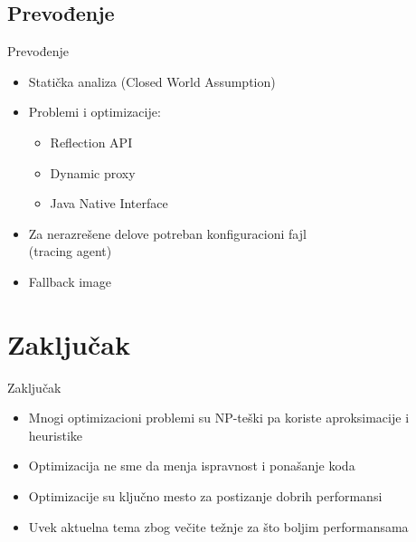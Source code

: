 \documentclass[compress, containsverbatim,mathserif, xcolor=dvipsnames, unicode]{beamer}
\begin{document}
\subsection{Prevođenje}
\begin{frame}{Prevođenje}
    \begin{itemize}
        \item Statička analiza (Closed World Assumption)
        \vspace{1em}
        \item Problemi i optimizacije:
        \begin{itemize}
            \item Reflection API
            \item Dynamic proxy
            \item Java Native Interface
        \end{itemize}        
        \vspace{1em}
        \item Za nerazrešene delove potreban konfiguracioni fajl \\ (tracing agent)
        \item Fallback image
    \end{itemize}
\end{frame}

\section{Zaključak}
\begin{frame}{Zaključak}
    \begin{itemize}
        \item Mnogi optimizacioni problemi su NP-teški pa koriste aproksimacije i heuristike
        \item Optimizacija ne sme da menja ispravnost i ponašanje koda
        \item Optimizacije su ključno mesto za postizanje dobrih performansi
        \item Uvek aktuelna tema zbog večite težnje za što boljim performansama
    \end{itemize}
\end{frame}
\end{document}
